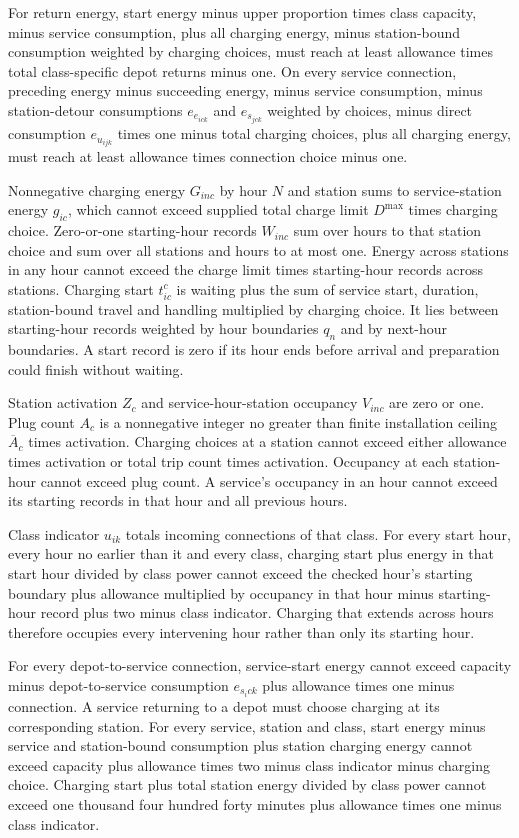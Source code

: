 \documentclass[10pt]{article}
\begin{document}
For return energy, start energy minus upper proportion times class capacity, minus service consumption, plus all charging energy, minus station-bound consumption weighted by charging choices, must reach at least allowance times total class-specific depot returns minus one. On every service connection, preceding energy minus succeeding energy, minus service consumption, minus station-detour consumptions $e_{e_{ic k}}$ and $e_{s_{j c k}}$ weighted by choices, minus direct consumption $e_{u_{ij k}}$ times one minus total charging choices, plus all charging energy, must reach at least allowance times connection choice minus one.

Nonnegative charging energy $G_{inc}$ by hour $N$ and station sums to service-station energy $g_{ic}$, which cannot exceed supplied total charge limit $D^{\max}$ times charging choice. Zero-or-one starting-hour records $W_{inc}$ sum over hours to that station choice and sum over all stations and hours to at most one. Energy across stations in any hour cannot exceed the charge limit times starting-hour records across stations. Charging start $t_{ic}^c$ is waiting plus the sum of service start, duration, station-bound travel and handling multiplied by charging choice. It lies between starting-hour records weighted by hour boundaries $q_n$ and by next-hour boundaries. A start record is zero if its hour ends before arrival and preparation could finish without waiting.

Station activation $Z_c$ and service-hour-station occupancy $V_{inc}$ are zero or one. Plug count $A_c$ is a nonnegative integer no greater than finite installation ceiling $\overline A_c$ times activation. Charging choices at a station cannot exceed either allowance times activation or total trip count times activation. Occupancy at each station-hour cannot exceed plug count. A service's occupancy in an hour cannot exceed its starting records in that hour and all previous hours.

Class indicator $u_{ik}$ totals incoming connections of that class. For every start hour, every hour no earlier than it and every class, charging start plus energy in that start hour divided by class power cannot exceed the checked hour's starting boundary plus allowance multiplied by occupancy in that hour minus starting-hour record plus two minus class indicator. Charging that extends across hours therefore occupies every intervening hour rather than only its starting hour.

For every depot-to-service connection, service-start energy cannot exceed capacity minus depot-to-service consumption $e_{s_i c k}$ plus allowance times one minus connection. A service returning to a depot must choose charging at its corresponding station. For every service, station and class, start energy minus service and station-bound consumption plus station charging energy cannot exceed capacity plus allowance times two minus class indicator minus charging choice. Charging start plus total station energy divided by class power cannot exceed one thousand four hundred forty minutes plus allowance times one minus class indicator.
\end{document}
